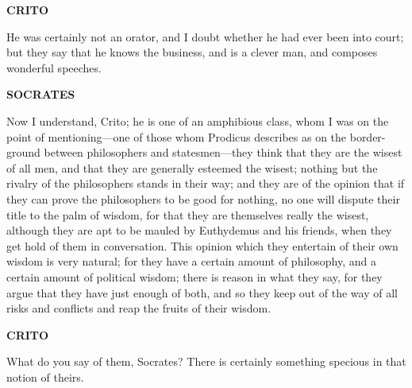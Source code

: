 \documentclass[11pt,letter]{article}
\begin{document}
\par \textbf{CRITO}
\par   He was certainly not an orator, and I doubt whether he had ever been into court; but they say that he knows the business, and is a clever man, and composes wonderful speeches.

\par \textbf{SOCRATES}
\par   Now I understand, Crito; he is one of an amphibious class, whom I was on the point of mentioning—one of those whom Prodicus describes as on the border-ground between philosophers and statesmen—they think that they are the wisest of all men, and that they are generally esteemed the wisest; nothing but the rivalry of the philosophers stands in their way; and they are of the opinion that if they can prove the philosophers to be good for nothing, no one will dispute their title to the palm of wisdom, for that they are themselves really the wisest, although they are apt to be mauled by Euthydemus and his friends, when they get hold of them in conversation. This opinion which they entertain of their own wisdom is very natural; for they have a certain amount of philosophy, and a certain amount of political wisdom; there is reason in what they say, for they argue that they have just enough of both, and so they keep out of the way of all risks and conflicts and reap the fruits of their wisdom.

\par \textbf{CRITO}
\par   What do you say of them, Socrates? There is certainly something specious in that notion of theirs.
\end{document}
